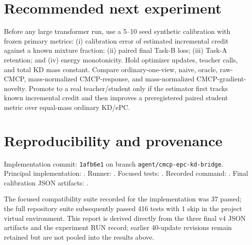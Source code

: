 \documentclass[10pt]{article}
\begin{document}
\section*{Recommended next experiment}

Before any large transformer run, use a 5--10 seed synthetic calibration with
frozen primary metrics: (i) calibration error of estimated incremental credit
against a known mixture fraction; (ii) paired final Task-B loss; (iii) Task-A
retention; and (iv) energy monotonicity. Hold optimizer updates, teacher calls,
and total KD mass constant. Compare ordinary-one-view, naive, oracle,
raw-CMCP, mass-normalized CMCP-response, and mass-normalized
CMCP-gradient-novelty. Promote to a real teacher/student only if the estimator
first tracks known incremental credit and then improves a preregistered paired
student metric over equal-mass ordinary KD/ePC.

\section*{Reproducibility and provenance}

Implementation commit: \texttt{1afb6e1} on branch
\texttt{agent/cmcp-epc-kd-bridge}. Principal implementation:
. Runner:
. Focused tests:
. Recorded command: .
Final calibration JSON artifacts:
.

The focused compatibility suite recorded for the implementation was 37 passed;
the full repository suite subsequently passed 416 tests with 1 skip in the
project virtual environment. This report is derived directly from the three
final v4 JSON artifacts and the experiment RUN record; earlier 40-update
revisions remain retained but are not pooled into the results above.
\end{document}
